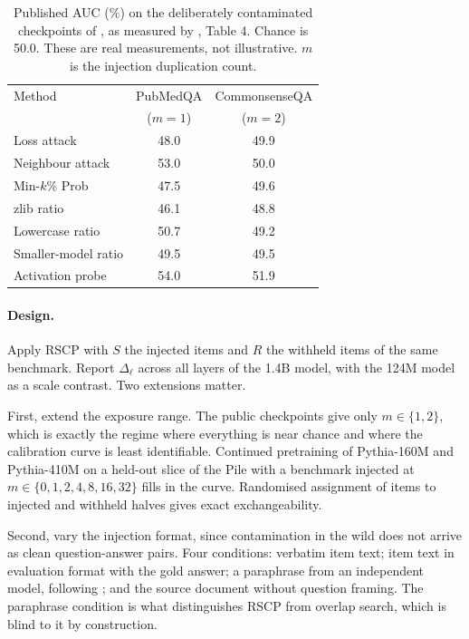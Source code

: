 \documentclass[10pt,twocolumn,letterpaper]{article}
\begin{document}
\begin{table}[t]
\small
\begin{tabular}{@{}lcc@{}}
\toprule
Method & PubMedQA & CommonsenseQA \\
       & ($m{=}1$) & ($m{=}2$) \\
\midrule
Loss attack            & 48.0 & 49.9 \\
Neighbour attack       & 53.0 & 50.0 \\
Min-$k$\% Prob         & 47.5 & 49.6 \\
zlib ratio             & 46.1 & 48.8 \\
Lowercase ratio        & 50.7 & 49.2 \\
Smaller-model ratio    & 49.5 & 49.5 \\
Activation probe       & 54.0 & 51.9 \\
\bottomrule
\end{tabular}
\caption{Published AUC (\%) on the deliberately contaminated checkpoints of \citet{oren2024proving}, as measured by \citet{liu2024probing}, Table 4. Chance is 50.0. These are real measurements, not illustrative. $m$ is the injection duplication count.}
\label{tab:we2published}
\end{table}

\paragraph{Design.} Apply RSCP with $S$ the injected items and $R$ the withheld items of the same benchmark. Report $\Delta_\ell$ across all layers of the 1.4B model, with the 124M model as a scale contrast. Two extensions matter.

First, extend the exposure range. The public checkpoints give only $m\in\{1,2\}$, which is exactly the regime where everything is near chance and where the calibration curve is least identifiable. Continued pretraining of Pythia-160M and Pythia-410M on a held-out slice of the Pile with a benchmark injected at $m\in\{0,1,2,4,8,16,32\}$ fills in the curve. Randomised assignment of items to injected and withheld halves gives exact exchangeability.

Second, vary the injection format, since contamination in the wild does not arrive as clean question-answer pairs. Four conditions: verbatim item text; item text in evaluation format with the gold answer; a paraphrase from an independent model, following \citet{yang2023rephrased}; and the source document without question framing. The paraphrase condition is what distinguishes RSCP from overlap search, which is blind to it by construction.
\end{document}
